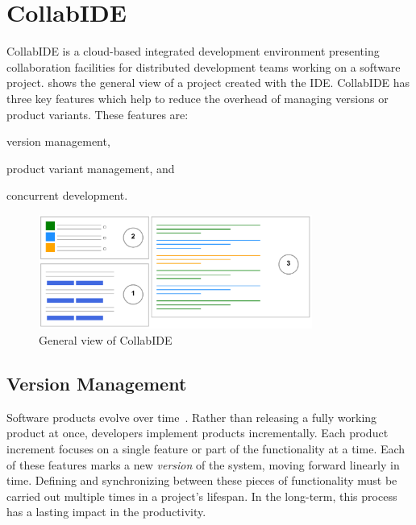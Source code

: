 
\section{CollabIDE}
\label{sec:collab-ide}

CollabIDE is a cloud-based integrated development environment presenting collaboration facilities 
for distributed development teams working on a software project.  shows the general view of a project created with the IDE. 
CollabIDE has three key features which help to reduce the overhead of managing versions or product variants. These features are:
\begin{enumerate*}[label=(\arabic*)] 
\item version management, 
\item product variant management, and 
\item concurrent development.
\end{enumerate*}

\begin{figure}[tbp]
  \centering
  \includegraphics[width=0.8\textwidth]{img/collabIDEGeneral}
  \caption{General view of CollabIDE}
  \label{fig:general-view}
\end{figure}

\subsection{Version Management}
\label{sec:vcs}
Software products evolve over time~\cite{lehman02}. Rather than releasing a fully working product at 
once, developers implement products incrementally. Each product increment focuses on a single 
feature or part of the functionality at a time. Each of these features marks a new \emph{version} of the 
system, moving forward linearly in time. Defining and synchronizing between these pieces of 
functionality must be carried out multiple times in a project's lifespan. In the long-term, this process 
has a lasting impact in the productivity.

